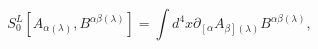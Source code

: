 \begin{equation}
S_{0}^{L}\left[ A_{\alpha (\lambda )},B^{\alpha \beta (\lambda )}\right]
=\int d^{4}x\partial _{\left[ \alpha \right. }A_{\left. \beta \right]
(\lambda )}B^{\alpha \beta (\lambda )},  \label{cin1}
\end{equation}

